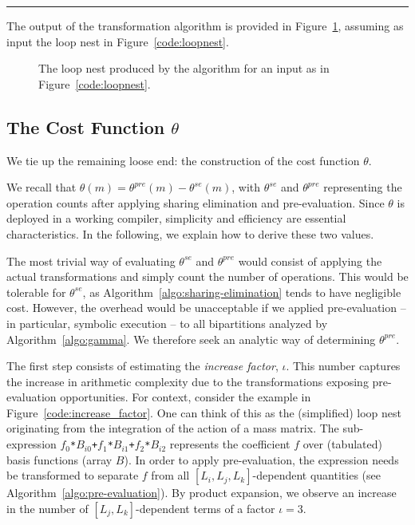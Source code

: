 \noindent\rule[1.0ex]{\linewidth}{0.7pt}

The output of the transformation algorithm is provided in Figure~\ref{code:loopnest-opt}, assuming as input the loop nest in Figure~\ref{code:loopnest}. 

\begin{figure}[h]\begin{CenteredBox}

\end{CenteredBox}\caption{The loop nest produced by the algorithm for an input as in Figure~\ref{code:loopnest}.}\label{code:loopnest-opt}\end{figure}


\subsection{The Cost Function $\theta$}
\label{sec:op_count}
We tie up the remaining loose end: the construction of the cost function $\theta$.

We recall that $\theta(m) = \theta^{pre}(m) - \theta^{se}(m)$, with $\theta^{se}$ and $\theta^{pre}$ representing the operation counts after applying sharing elimination and pre-evaluation. Since $\theta$ is deployed in a working compiler, simplicity and efficiency are essential characteristics. In the following, we explain how to derive these two values.

The most trivial way of evaluating $\theta^{se}$ and $\theta^{pre}$ would consist of applying the actual transformations and simply count the number of operations. This would be tolerable for $\theta^{se}$, as Algorithm~\ref{algo:sharing-elimination} tends to have negligible cost. However, the overhead would be unacceptable if we applied pre-evaluation -- in particular, symbolic execution -- to all bipartitions analyzed by Algorithm~\ref{algo:gamma}. We therefore seek an analytic way of determining $\theta^{pre}$.

The first step consists of estimating the \textit{increase factor}, $\iota$. This number captures the increase in arithmetic complexity due to the transformations exposing pre-evaluation opportunities. For context, consider the example in Figure~\ref{code:increase_factor}. One can think of this as the (simplified) loop nest originating from the integration of the action of a mass matrix. The sub-expression \texttt{$f_0$*$B_{i0}$+$f_1$*$B_{i1}$+$f_2$*$B_{i2}$} represents the coefficient $f$ over (tabulated) basis functions (array $B$). In order to apply pre-evaluation, the expression needs be transformed to separate $f$ from all $[L_i, L_j, L_k]$-dependent quantities (see Algorithm~\ref{algo:pre-evaluation}). By product expansion, we observe an increase in the number of $[L_j, L_k]$-dependent terms of a factor $\iota = 3$.

